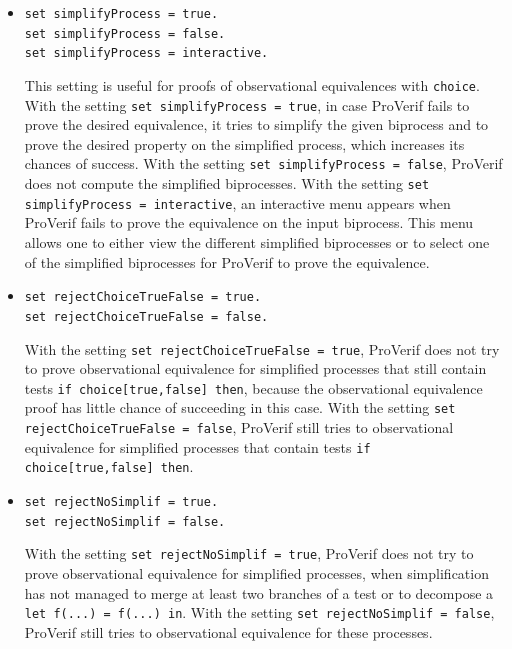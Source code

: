 \documentclass{book}
\begin{document}
\begin{itemize}

\item \lstinline{set simplifyProcess = true.}\\
\lstinline{set simplifyProcess = false.}\\
\lstinline{set simplifyProcess = interactive.}

This setting is useful for proofs of observational equivalences with \lstinline!choice!. With the setting \lstinline{set simplifyProcess = true}, in case ProVerif fails to prove the desired equivalence, it tries to simplify the given biprocess and to prove the desired property on the simplified process, which increases its chances of success. With the setting \lstinline{set simplifyProcess = false}, ProVerif does not compute the simplified biprocesses. With the setting \lstinline{set simplifyProcess = interactive}, an interactive menu appears when ProVerif fails to prove the equivalence on the input biprocess. This menu allows one to either view the different simplified biprocesses or to select one of the simplified biprocesses for ProVerif to prove the equivalence.

\item \lstinline{set rejectChoiceTrueFalse = true.}\\
\lstinline{set rejectChoiceTrueFalse = false.}

With the setting \lstinline{set rejectChoiceTrueFalse = true},
ProVerif does not try to prove observational equivalence for simplified
processes that still contain tests \lstinline!if choice[true,false] then!,
because the observational equivalence proof has little chance of
succeeding in this case.
With the setting \lstinline{set rejectChoiceTrueFalse = false},
ProVerif still tries to observational equivalence for simplified
processes that contain tests \lstinline!if choice[true,false] then!.

\item \lstinline{set rejectNoSimplif = true.}\\
\lstinline{set rejectNoSimplif = false.}

With the setting \lstinline{set rejectNoSimplif = true},
ProVerif does not try to prove observational equivalence for simplified
processes, when simplification has not managed to merge at least
two branches of a test or to decompose a \lstinline!let f(...) = f(...) in!.
With the setting \lstinline{set rejectNoSimplif = false},
ProVerif still tries to observational equivalence for these processes.

\end{itemize}
\end{document}
